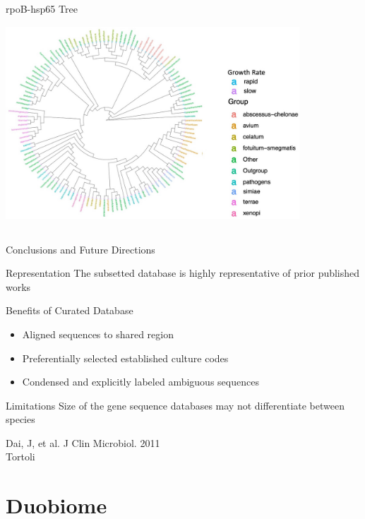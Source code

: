 \documentclass[11pt]{beamer}
\begin{document}
	\begin{frame}{rpoB-hsp65 Tree}
	\includegraphics[height=8cm, width=11cm]{CPBS_11_18/Tree2.jpg}
	\end{frame}

	\begin{frame}{Conclusions and Future Directions}
	
	\begin{block}{Representation}
	The subsetted database is highly representative of prior published works
	\end{block}
	
	\begin{block}{Benefits of Curated Database}
	\begin{itemize}
	\item Aligned sequences to shared region
	\item Preferentially selected established culture codes
	\item Condensed and explicitly labeled ambiguous sequences 
  \end{itemize}
	\end{block}
	
	\begin{block}{Limitations}
	Size of the gene sequence databases may not differentiate between species
	\end{block}
	
	\tiny{Dai, J, et al. J Clin Microbiol. 2011 \\ Tortoli}
  \end{frame}
	

\section{Duobiome}
\end{document}
